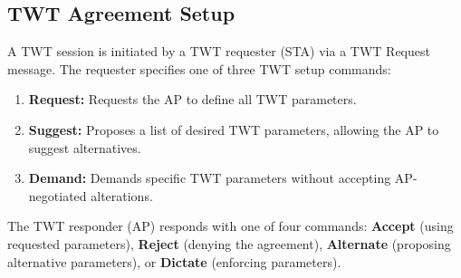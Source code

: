 \subsection{TWT Agreement Setup}
A TWT session is initiated by a TWT requester (STA) via a TWT Request message. The requester specifies one of three TWT setup commands:
\begin{enumerate}
    \item \textbf{Request:} Requests the AP to define all TWT parameters.
    \item \textbf{Suggest:} Proposes a list of desired TWT parameters, allowing the AP to suggest alternatives.
    \item \textbf{Demand:} Demands specific TWT parameters without accepting AP-negotiated alterations.
\end{enumerate}
The TWT responder (AP) responds with one of four commands: \textbf{Accept} (using requested parameters), \textbf{Reject} (denying the agreement), \textbf{Alternate} (proposing alternative parameters), or \textbf{Dictate} (enforcing parameters).

